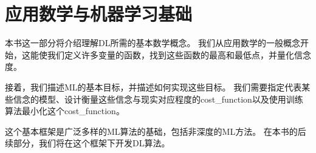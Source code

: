 \part{应用数学与机器学习基础}
\label{part:applied_math_and_machine_learning_basics}

\newpage

本书这一部分将介绍理解\gls{DL}所需的基本数学概念。
我们从应用数学的一般概念开始，这能使我们定义许多变量的函数，找到这些函数的最高和最低点，并量化信念度。

接着，我们描述\gls{ML}的基本目标，并描述如何实现这些目标。
我们需要指定代表某些信念的模型、设计衡量这些信念与现实对应程度的\gls{cost_function}以及使用训练算法最小化这个\gls{cost_function}。


这个基本框架是广泛多样的\gls{ML}算法的基础，包括非深度的\gls{ML}方法。
在本书的后续部分，我们将在这个框架下开发\gls{DL}算法。






